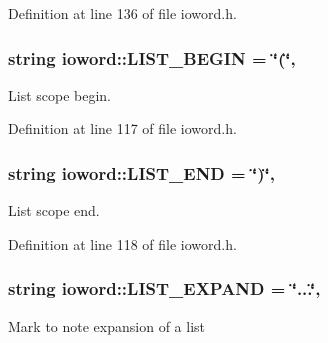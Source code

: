 Definition at line 136 of file ioword.\-h.

\hypertarget{classosea_1_1ofreq_1_1ioword_a775e20c2e5fca4c2f9ac92fdd03d4df6}{
\subsubsection[{L\-I\-S\-T\-\_\-\-B\-E\-G\-I\-N}]{\setlength{\rightskip}{0pt plus 5cm}string ioword\-::\-L\-I\-S\-T\-\_\-\-B\-E\-G\-I\-N = \char`\"{}(\char`\"{}\hspace{0.3cm}{\ttfamily [static]}, {\ttfamily [protected]}}}\label{classosea_1_1ofreq_1_1ioword_a775e20c2e5fca4c2f9ac92fdd03d4df6}
List scope begin. 

Definition at line 117 of file ioword.\-h.

\hypertarget{classosea_1_1ofreq_1_1ioword_a57eccd642a760b04c22677dfb102ac59}{
\subsubsection[{L\-I\-S\-T\-\_\-\-E\-N\-D}]{\setlength{\rightskip}{0pt plus 5cm}string ioword\-::\-L\-I\-S\-T\-\_\-\-E\-N\-D = \char`\"{})\char`\"{}\hspace{0.3cm}{\ttfamily [static]}, {\ttfamily [protected]}}}\label{classosea_1_1ofreq_1_1ioword_a57eccd642a760b04c22677dfb102ac59}
List scope end. 

Definition at line 118 of file ioword.\-h.

\hypertarget{classosea_1_1ofreq_1_1ioword_a7044cf3828d3f8d89b03774337f3e5ac}{
\subsubsection[{L\-I\-S\-T\-\_\-\-E\-X\-P\-A\-N\-D}]{\setlength{\rightskip}{0pt plus 5cm}string ioword\-::\-L\-I\-S\-T\-\_\-\-E\-X\-P\-A\-N\-D = \char`\"{}...\char`\"{}\hspace{0.3cm}{\ttfamily [static]}, {\ttfamily [protected]}}}\label{classosea_1_1ofreq_1_1ioword_a7044cf3828d3f8d89b03774337f3e5ac}
Mark to note expansion of a list 

